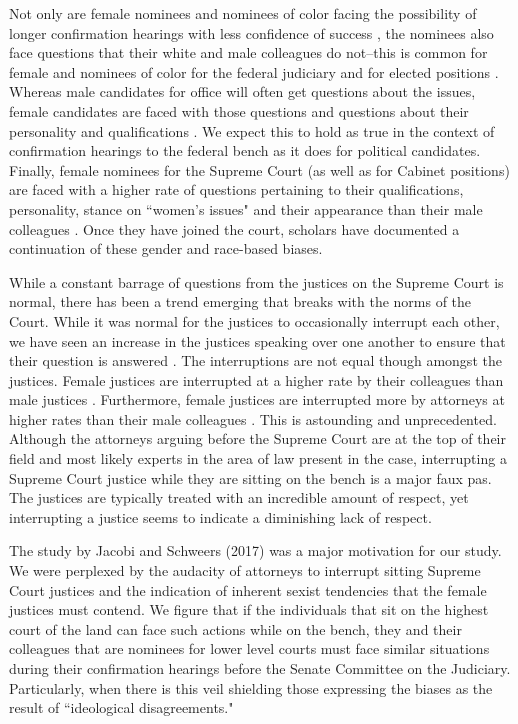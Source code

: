 \documentclass [12pt]{article}
\begin{document}
Not only are female nominees and nominees of color facing the possibility of longer confirmation hearings with less confidence of success \citep{Asmussen2011}, the nominees also face questions that their white and male colleagues do not--this is common for female and nominees of color for the federal judiciary and for elected positions \citep{Boyd2018, Hayes2015a, Devitt2002, Palmer2010, Schultz1997}. Whereas male candidates for office will often get questions about the issues, female candidates are faced with those questions and questions about their personality and qualifications \citep{Devitt2002}. We expect this to hold as true in the context of confirmation hearings to the federal bench as it does for political candidates. Finally, female nominees for the Supreme Court (as well as for Cabinet positions) are faced with a higher rate of questions pertaining to their qualifications, personality, stance on ``women's issues" and their appearance than their male colleagues \citep{Boyd2018, Hayes2015a, Devitt2002, Palmer2010, Schultz1997}. Once they have joined the court, scholars have documented a continuation of these gender and race-based biases.

While a constant barrage of questions from the justices on the Supreme Court is normal, there has been a trend emerging that breaks with the norms of the Court. While it was normal for the justices to occasionally interrupt each other, we have seen an increase in the justices speaking over one another to ensure that their question is answered \citep{Jacobi2017}. The interruptions are not equal though amongst the justices. Female justices are interrupted at a higher rate by their colleagues than male justices \citep{Jacobi2017}. Furthermore, female justices are interrupted more by attorneys at higher rates than their male colleagues \citep{Jacobi2017}. This is astounding and unprecedented. Although the attorneys arguing before the Supreme Court are at the top of their field and most likely experts in the area of law present in the case, interrupting a Supreme Court justice while they are sitting on the bench is a major faux pas. The justices are typically treated with an incredible amount of respect, yet interrupting a justice seems to indicate a diminishing lack of respect. 

The study by Jacobi and Schweers (2017) was a major motivation for our study. We were perplexed by the audacity of attorneys to interrupt sitting Supreme Court justices and the indication of inherent sexist tendencies that the female justices must contend. We figure that if the individuals that sit on the highest court of the land can face such actions while on the bench, they and their colleagues that are nominees for lower level courts must face similar situations during their confirmation hearings before the Senate Committee on the Judiciary. Particularly, when there is this veil shielding those expressing the biases as the result of ``ideological disagreements."
\end{document}
